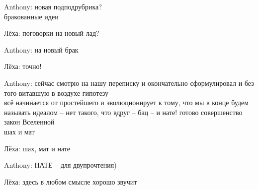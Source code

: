 \begin{flushleft}
\begin{miamalist}
  \item[Anthony:] новая подподрубрика?\\
бракованные идеи\\
  \item[Лёха:] поговорки на новый лад?\\
  \item[Anthony:] на новый брак\\
  \item[Лёха:] точно!\\
  \item[Anthony:] сейчас смотрю на нашу переписку и окончательно сформулировал и без того витавшую в воздухе гипотезу\\
всё начинается от простейшего и эволюционирует к тому, что мы в конце будем называть идеалом -- нет такого, что вдруг -- бац -- и нате! готово совершенство\\
закон Вселенной\\
шах и мат\\
  \item[Лёха:] шах, мат и нате\\
  \item[Anthony:] НАТЕ -- для двупрочтения)\\
  \item[Лёха:] здесь в любом смысле хорошо звучит
\end{miamalist}







\end{flushleft}
